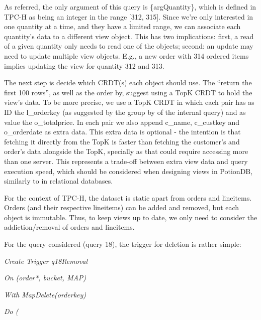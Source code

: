 \documentclass{vldb}
\newcommand{\grumbler}[2]{{\color{red}{\bf #1:} #2}}
\renewcommand{\grumbler}[2]{}
\newcommand{\andre}[1]{\grumbler{andre}{#1}}
\newcommand{\emphvspace}{0.5\baselineskip}
\newcommand{\firstblockemph}[1]{\vspace{\emphvspace}\hspace{2em}\emph{#1}}
\newcommand{\middleblockemph}[1]{\hspace{2em}\emph{#1}}
\begin{document}
As referred, the only argument of this query is \{argQuantity\}, which is defined in TPC-H as being an integer in the range [312, 315].
Since we're only interested in one quantity at a time, and they have a limited range, we can associate each quantity's data to a different view object.
This has two implications: first, a read of a given quantity only needs to read one of the objects; second: an update may need to update multiple view objects.
E.g., a new order with 314 ordered items implies updating the view for quantity 312 and 313.

The next step is decide which CRDT(s) each object should use.
The ``return the first 100 rows'', as well as the order by, suggest using a TopK CRDT to hold the view's data.
To be more precise, we use a TopK CRDT in which each pair has as ID the l\_orderkey (as suggested by the group by of the internal query) and as value the o\_totalprice.
In each pair we also append c\_name, c\_custkey and o\_orderdate as extra data.
This extra data is optional - the intention is that fetching it directly from the TopK is faster than fetching the customer's and order's data alongside the TopK, specially as that could require accessing more than one server.
This represents a trade-off between extra view data and query execution speed, which should be considered when designing views in PotionDB, similarly to in relational databases.

\andre{I don't really have any specific logic that I use as reference to define the updates... I just think on how to translate an object update into a view update.}

For the context of TPC-H, the dataset is static apart from orders and lineitems.
Orders (and their respective lineitems) can be added and removed, but each object is immutable.
Thus, to keep views up to date, we only need to consider the addiction/removal of orders and lineitems.

For the query considered (query 18), the trigger for deletion is rather simple:

\firstblockemph{\hspace{-1.2em}Create Trigger q18Removal}

\middleblockemph{\hspace{-1.2em}On (order*, bucket, MAP)}

\middleblockemph{\hspace{-1.2em}With MapDelete(orderkey)}

\middleblockemph{\hspace{-1.2em}Do (}
\end{document}
